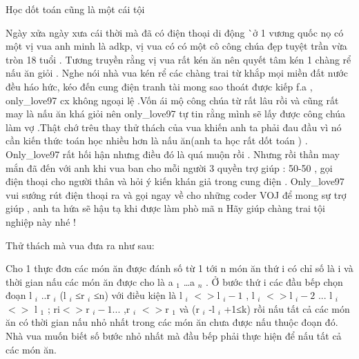 Học dốt toán cũng là một cái tội  



   Ngày xửa ngày xưa cái thời mà đã có điện thoại di động ^^ ở 1 vương quốc nọ có một vị vua anh minh là adkp, vị vua có có một cô công chúa đẹp tuyệt trần vừa tròn 18 tuổi . Tương truyền rằng vị vua rất kén ăn nên quyết tâm kén 1 chàng rể nấu ăn giỏi . Nghe nói nhà vua kén rể các chàng trai từ khắp mọi miền đất nước đều háo hức, kéo đến cung điện tranh tài mong sao thoát được kiếp f.a , only\_love97 cx không ngoại lệ .Vốn ái mộ công chúa từ rất lâu rồi và cũng rất may là nấu ăn khá giỏi nên only\_love97 tự tin rằng mình sẽ lấy được công chúa làm vợ .Thật chớ trêu thay thử thách của vua khiến anh ta phải đau đầu vì nó cần kiến thức toán học nhiều hơn là nấu ăn(anh ta học rất dốt toán ) . Only\_love97 rất hối hận nhưng điều đó là quá muộn rồi . Nhưng rồi thần may mắn đã đến với anh khi vua ban cho mỗi người 3 quyền trợ giúp : 50-50 , gọi điện thoại cho người thân và hỏi ý kiến khán giả trong cung điện . Only\_love97 vui sướng rút điện thoại ra và gọi ngay về cho những coder VOJ để mong sự trợ giúp , anh ta hứa sẽ hậu tạ khi được làm phò mã ^^. Hãy giúp chàng trai tội nghiệp này nhé !  

   Thử thách mà vua đưa ra như sau:  

   Cho 1 thực đơn các món ăn được đánh số từ 1 tới n món ăn thứ i có chỉ số là i và thời gian nấu các món ăn được cho là a   $_    1   $   …a   $_    n   $   . Ở bước thứ i các đầu bếp chọn đoạn l   $_    i   $   ..r   $_    i   $   (l   $_    i   $   ≤r   $_    i   $   ≤n) với điều kiện là l   $_    i   $   $<$$>$l   $_    i-1   $   , l   $_    i   $   $<$$>$l   $_    i-2   $   ... l   $_    i   $   $<$$>$ l   $_    1   $   ; ri$<$$>$r   $_    i-1...   $   ,r   $_    i   $   $<$$>$r   $_    1   $   và (r   $_    i   $   -l   $_    i   $   +1≤k) rồi nấu tất cả các món ăn có thời gian nấu nhỏ nhất trong các món ăn chưa được nấu thuộc đoạn đó. Nhà vua muốn biết số bước nhỏ nhất mà đầu bếp phải thực hiện để nấu tất cả các món ăn.  

\